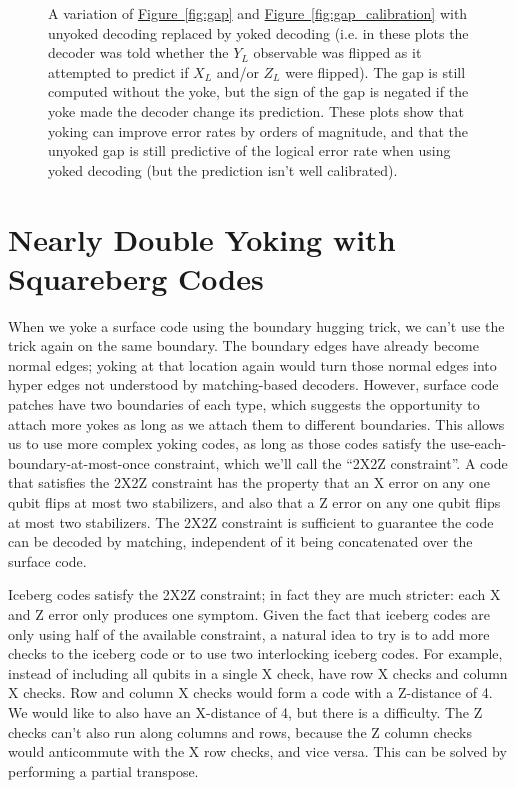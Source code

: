 \documentclass[onecolumn,unpublished,a4paper]{quantumarticle}
\theoremstyle{definition}
\theoremstyle{definition}
\theoremstyle{definition}
\newcommand{\fig}[1]{\hyperref[fig:#1]{Figure~\ref*{fig:#1}}}
\begin{document}
\begin{figure}[h]
{    }
    \caption{
        A variation of \fig{gap} and \fig{gap_calibration} with unyoked decoding replaced by yoked decoding (i.e. in these plots the decoder was told whether the $Y_L$ observable was flipped as it attempted to predict if $X_L$ and/or $Z_L$ were flipped).
        The gap is still computed without the yoke, but the sign of the gap is negated if the yoke made the decoder change its prediction.
        These plots show that yoking can improve error rates by orders of magnitude, and that the unyoked gap is still predictive of the logical error rate when using yoked decoding (but the prediction isn't well calibrated).
    }
    \label{fig:yoked_gap}
\end{figure}


\section{Nearly Double Yoking with Squareberg Codes}
\label{app:squareberg}

When we yoke a surface code using the boundary hugging trick, we can't use the trick again on the same boundary.
The boundary edges have already become normal edges; yoking at that location again would turn those normal edges into hyper edges not understood by matching-based decoders.
However, surface code patches have two boundaries of each type, which suggests the opportunity to attach more yokes as long as we attach them to different boundaries.
This allows us to use more complex yoking codes, as long as those codes satisfy the use-each-boundary-at-most-once constraint, which we'll call the ``2X2Z constraint''.
A code that satisfies the 2X2Z constraint has the property that an X error on any one qubit flips at most two stabilizers, and also that a Z error on any one qubit flips at most two stabilizers.
The 2X2Z constraint is sufficient to guarantee the code can be decoded by matching, independent of it being concatenated over the surface code.

Iceberg codes satisfy the 2X2Z constraint; in fact they are much stricter: each X and Z error only produces one symptom.
Given the fact that iceberg codes are only using half of the available constraint, a natural idea to try is to add more checks to the iceberg code or to use two interlocking iceberg codes.
For example, instead of including all qubits in a single X check, have row X checks and column X checks.
Row and column X checks would form a code with a Z-distance of 4.
We would like to also have an X-distance of 4, but there is a difficulty.
The Z checks can't also run along columns and rows, because the Z column checks would anticommute with the X row checks, and vice versa.
This can be solved by performing a partial transpose.
\end{document}
